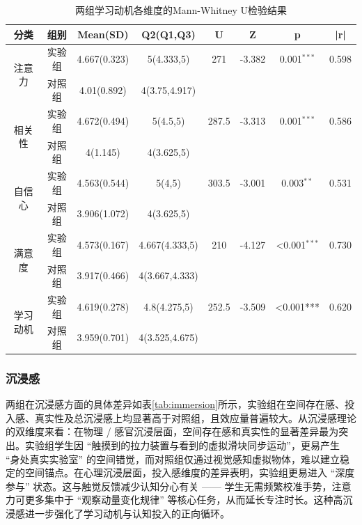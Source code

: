 \documentclass[runningheads]{llncs}
\begin{document}
\begin{table}[t]
\centering
\setlength{\tabcolsep}{3pt} %
\caption{两组学习动机各维度的Mann-Whitney U检验结果}
\label{tab:learning-motivation}
\begin{tabular}{cccccccc}
\toprule
\textbf{分类} & \textbf{组别} & \textbf{Mean(SD)} & \textbf{Q2(Q1,Q3)} & \textbf{U} & \textbf{Z} & \textbf{p} & \textbf{|r|} \\
\midrule
\multirow{2}{*}{注意力} 
& 实验组 & 4.667(0.323) & 5(4.333,5) & 271 & -3.382 & 0.001\(^{***}\) & 0.598 \\
& 对照组 & 4.01(0.892) & 4(3.75,4.917) &  &  &  &  \\
\multirow{2}{*}{相关性} 
& 实验组 & 4.672(0.494) & 5(4.5,5) & 287.5 & -3.313 & 0.001\(^{***}\) & 0.586 \\
& 对照组 & 4(1.145) & 4(3.625,5) &  &  &  &  \\
\multirow{2}{*}{自信心} 
& 实验组 & 4.563(0.544) & 5(4,5) & 303.5 & -3.001 & 0.003\(^{**}\) & 0.531 \\
& 对照组 & 3.906(1.072) & 4(3.625,5) &  &  &  &  \\
\multirow{2}{*}{满意度} 
& 实验组 & 4.573(0.167) & 4.667(4.333,5) & 210 & -4.127 & <0.001\(^{***}\) & 0.730 \\
& 对照组 & 3.917(0.466) & 4(3.667,4.333) &  &  &  &  \\
\multirow{2}{*}{学习动机} 
& 实验组 & 4.619(0.278) & 4.8(4.275,5) & 252.5 & -3.509 & <0.001*** & 0.620 \\
& 对照组 & 3.959(0.701) & 4(3.525,4.675) &  &  &  &  \\
\bottomrule
\end{tabular}
\end{table}

\subsubsection{沉浸感}
两组在沉浸感方面的具体差异如表\ref{tab:immersion}所示，实验组在空间存在感、投入感、真实性及总沉浸感上均显著高于对照组，且效应量普遍较大。从沉浸感理论的双维度来看：在物理 / 感官沉浸层面，空间存在感和真实性的显著差异最为突出。实验组学生因 “触摸到的拉力装置与看到的虚拟滑块同步运动”，更易产生 “身处真实实验室” 的空间错觉，而对照组仅通过视觉感知虚拟物体，难以建立稳定的空间锚点。在心理沉浸层面，投入感维度的差异表明，实验组更易进入 “深度参与” 状态。这与触觉反馈减少认知分心有关 —— 学生无需频繁校准手势，注意力可更多集中于 “观察动量变化规律” 等核心任务，从而延长专注时长。这种高沉浸感进一步强化了学习动机与认知投入的正向循环。
\end{document}
